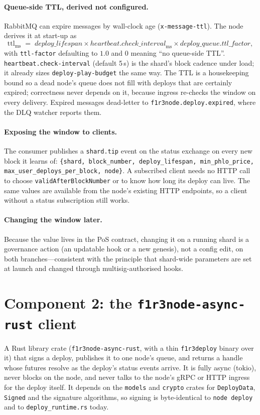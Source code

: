 \documentclass[11pt]{article}
\newcommand{\code}[1]{\texttt{#1}}
\begin{document}
\paragraph{Queue-side TTL, derived not configured.} RabbitMQ can expire messages by
wall-clock age (\code{x-message-ttl}). The node derives it at start-up as
\[
  \mathrm{ttl}_{\mathrm{ms}} \;=\; \mathit{deploy\_lifespan}
  \times \mathit{heartbeat.check\_interval}_{\mathrm{ms}}
  \times \mathit{deploy\_queue.ttl\_factor},
\]
with \code{ttl-factor} defaulting to $1.0$ and $0$ meaning ``no queue-side TTL''.
\code{heartbeat.check-interval} (default 5\,s) is the shard's block cadence under
load; it already sizes \code{deploy-play-budget} the same way. The TTL is a
housekeeping bound so a dead node's queue does not fill with deploys that are
certainly expired; correctness never depends on it, because ingress re-checks the
window on every delivery. Expired messages dead-letter to
\code{f1r3node.deploy.expired}, where the DLQ watcher reports them.

\paragraph{Exposing the window to clients.} The consumer publishes a \code{shard.tip}
event on the status exchange on every new block it learns of:
\code{\{shard, block\_number, deploy\_lifespan, min\_phlo\_price,
max\_user\_deploys\_per\_block, node\}}. A subscribed client needs no HTTP call to
choose \code{validAfterBlockNumber} or to know how long its deploy can live. The same
values are available from the node's existing HTTP endpoints, so a client without a
status subscription still works.

\paragraph{Changing the window later.} Because the value lives in the PoS contract,
changing it on a running shard is a governance action (an updatable hook or a new
genesis), not a config edit, on both branches---consistent with the principle that
shard-wide parameters are set at launch and changed through multisig-authorised hooks.

\section{Component 2: the \code{f1r3node-async-rust} client}
\label{sec:client}

A Rust library crate (\code{f1r3node-async-rust}, with a thin \code{f1r3deploy}
binary over it) that signs a deploy, publishes it to one node's queue, and returns a
handle whose futures resolve as the deploy's status events arrive. It is fully async
(tokio), never blocks on the node, and never talks to the node's gRPC or HTTP ingress
for the deploy itself. It depends on the \code{models} and \code{crypto} crates for
\code{DeployData}, \code{Signed} and the signature algorithms, so signing is
byte-identical to \code{node deploy} and to \code{deploy\_runtime.rs} today.
\end{document}
